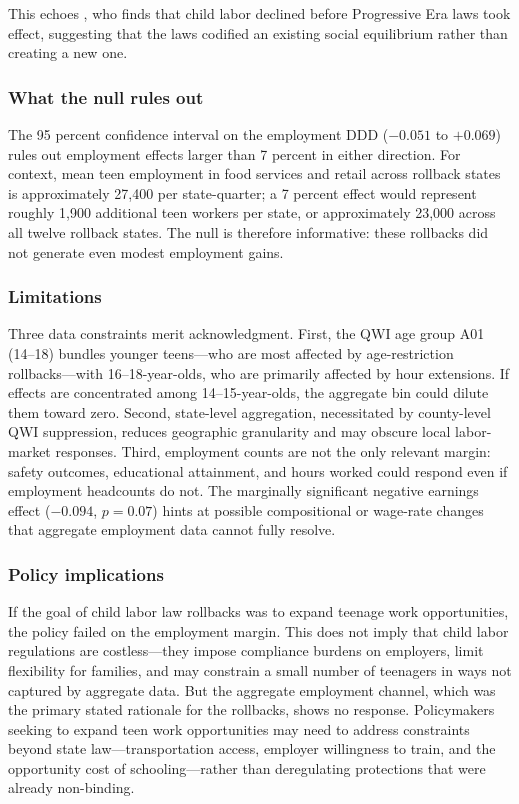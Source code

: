 \documentclass[12pt]{article}
\begin{document}
This echoes \citet{moehling1999}, who finds that child labor declined before Progressive Era laws took effect, suggesting that the laws codified an existing social equilibrium rather than creating a new one.

\subsubsection*{What the null rules out} The 95 percent confidence interval on the employment DDD ($-0.051$ to $+0.069$) rules out employment effects larger than 7 percent in either direction. For context, mean teen employment in food services and retail across rollback states is approximately 27,400 per state-quarter; a 7 percent effect would represent roughly 1,900 additional teen workers per state, or approximately 23,000 across all twelve rollback states. The null is therefore informative: these rollbacks did not generate even modest employment gains.

\subsubsection*{Limitations} Three data constraints merit acknowledgment. First, the QWI age group A01 (14--18) bundles younger teens---who are most affected by age-restriction rollbacks---with 16--18-year-olds, who are primarily affected by hour extensions. If effects are concentrated among 14--15-year-olds, the aggregate bin could dilute them toward zero. Second, state-level aggregation, necessitated by county-level QWI suppression, reduces geographic granularity and may obscure local labor-market responses. Third, employment counts are not the only relevant margin: safety outcomes, educational attainment, and hours worked could respond even if employment headcounts do not. The marginally significant negative earnings effect ($-0.094$, $p = 0.07$) hints at possible compositional or wage-rate changes that aggregate employment data cannot fully resolve.

\subsubsection*{Policy implications} If the goal of child labor law rollbacks was to expand teenage work opportunities, the policy failed on the employment margin. This does not imply that child labor regulations are costless---they impose compliance burdens on employers, limit flexibility for families, and may constrain a small number of teenagers in ways not captured by aggregate data. But the aggregate employment channel, which was the primary stated rationale for the rollbacks, shows no response. Policymakers seeking to expand teen work opportunities may need to address constraints beyond state law---transportation access, employer willingness to train, and the opportunity cost of schooling---rather than deregulating protections that were already non-binding.
\end{document}
